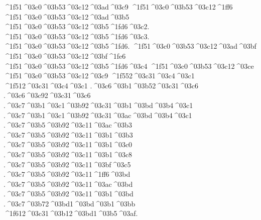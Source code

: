 {	^^^^1f51^^^^03c0^^^^03b53^^^^03c12^^^^03ad^^^^03c9 		%
	^^^^1f51^^^^03c0^^^^03b53^^^^03c12^^^^1ff6
	^^^^1f51^^^^03c0^^^^03b53^^^^03c12^^^^03ad^^^^03b5
	^^^^1f51^^^^03c0^^^^03b53^^^^03c12^^^^03b5^^^^1fd6^^^^03c2.
	^^^^1f51^^^^03c0^^^^03b53^^^^03c12^^^^03b5^^^^1fd6^^^^03c3.
	^^^^1f51^^^^03c0^^^^03b53^^^^03c12^^^^03b5^^^^1fd6.
	^^^^1f51^^^^03c0^^^^03b53^^^^03c12^^^^03ad^^^^03bf
	^^^^1f51^^^^03c0^^^^03b53^^^^03c12^^^^03bf^^^^1fe6
	^^^^1f51^^^^03c0^^^^03b53^^^^03c12^^^^03b5^^^^1fd6^^^^03c4
	^^^^1f51^^^^03c0^^^^03b53^^^^03c12^^^^03ce 		%
	^^^^1f51^^^^03c0^^^^03b53^^^^03c12^^^^03c9 		%
^^^^1f552^^^^03c31^^^^03c4^^^^03c1 		%
^^^^1f512^^^^03c31^^^^03c4^^^^03c1 		%
.^^^^03c6^^^^03b1^^^^03b52^^^^03c31^^^^03c6 		%
.^^^^03c6^^^^03c92^^^^03c31^^^^03c6  		%
.^^^^03c7^^^^03b1^^^^03c1^^^^03b92^^^^03c31^^^^03b1^^^^03bd^^^^03b4^^^^03c1 		%
.^^^^03c7^^^^03b1^^^^03c1^^^^03b92^^^^03c31^^^^03ac^^^^03bd^^^^03b4^^^^03c1
.^^^^03c7^^^^03b5^^^^03b92^^^^03c11^^^^03ac^^^^03b3 		%
.^^^^03c7^^^^03b5^^^^03b92^^^^03c11^^^^03b1^^^^03b3  		%
.^^^^03c7^^^^03b5^^^^03b92^^^^03c11^^^^03b1^^^^03c0  		%
.^^^^03c7^^^^03b5^^^^03b92^^^^03c11^^^^03b1^^^^03c8		%
.^^^^03c7^^^^03b5^^^^03b92^^^^03c11^^^^03bf^^^^03c5  		%
.^^^^03c7^^^^03b5^^^^03b92^^^^03c11^^^^1ff6^^^^03bd 		%
.^^^^03c7^^^^03b5^^^^03b92^^^^03c11^^^^03ac^^^^03bd
.^^^^03c7^^^^03b5^^^^03b92^^^^03c11^^^^03b1^^^^03bd
.^^^^03c7^^^^03b72^^^^03bd1^^^^03bd^^^^03b1^^^^03bb		%
^^^^1f612^^^^03c31^^^^03b12^^^^03bd1^^^^03b5^^^^03af. 		%
}
